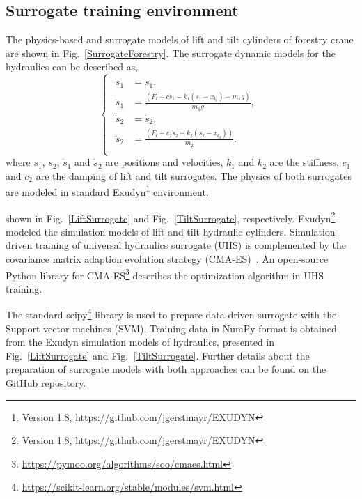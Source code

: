 \subsection{Surrogate training environment}
The physics-based and surrogate models of lift and tilt cylinders of forestry crane are shown in Fig.~\ref{SurrogateForestry}. The surrogate dynamic models for the hydraulics can be described as,
\begin{equation} \label{LiftCyl_DiffEqs}
\begin{cases}
\begin{aligned}
\dot{s}_1 &= \dot{s}_1,\\[6pt]
\ddot{s}_1 &= \frac{(F_{l}+c \dot{s}_1- k_1 (s_1-x_{l_0})-{m_1}g)}{{m_1}g},\\[6pt]
\dot{s}_2 &= \dot{s}_2, \\[6pt]
\ddot{s}_2 &= \frac{(F_{t}-c_2 \dot{s}_2+ k_2 (s_2-x_{t_0}))}{m_2}.\\[6pt]
\end{aligned}
\end{cases}
\end{equation}
where $s_1$, $s_2$, $\dot{s}_1$ and $\dot{s}_2$ are positions and velocities, $k_1$ and $k_2$ are the stiffness, $c_1$ and $c_2$ are the damping of lift and tilt surrogates. The physics of both surrogates are modeled in standard Exudyn\footnote{Version 1.8, \url{https://github.com/jgerstmayr/EXUDYN}} environment.


shown in Fig.~\ref{LiftSurrogate} and Fig.~\ref{TiltSurrogate}, respectively. Exudyn\footnote{Version 1.8, \url{https://github.com/jgerstmayr/EXUDYN}} modeled the simulation models of  lift and tilt hydraulic cylinders. Simulation-driven training of universal hydraulics surrogate (UHS) is complemented by the covariance matrix adaption evolution strategy (CMA-ES)~\cite{khadim2024simulation}. An open-source Python library for CMA-ES\footnote{\url{https://pymoo.org/algorithms/soo/cmaes.html}} describes the optimization algorithm in UHS training.

The standard scipy\footnote{\url{https://scikit-learn.org/stable/modules/svm.html}} library is used to prepare data-driven surrogate with the Support vector machines (SVM). Training data in NumPy format is obtained from the Exudyn simulation models of hydraulics, presented in Fig.~\ref{LiftSurrogate} and Fig.~\ref{TiltSurrogate}. Further details about the preparation of surrogate models with both approaches can be found on the  GitHub repository. 


